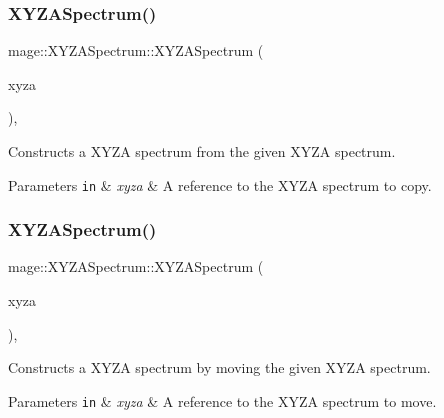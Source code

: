 \subsubsection{\texorpdfstring{X\+Y\+Z\+A\+Spectrum()}{XYZASpectrum()}\hspace{0.1cm}{\footnotesize\ttfamily [3/10]}}
{\footnotesize\ttfamily mage\+::\+X\+Y\+Z\+A\+Spectrum\+::\+X\+Y\+Z\+A\+Spectrum (\begin{DoxyParamCaption}\item[{const \hyperlink{structmage_1_1_x_y_z_a_spectrum}{X\+Y\+Z\+A\+Spectrum} \&}]{xyza }\end{DoxyParamCaption})\hspace{0.3cm}{\ttfamily [default]}, {\ttfamily [noexcept]}}

Constructs a X\+Y\+ZA spectrum from the given X\+Y\+ZA spectrum.


\begin{DoxyParams}[1]{Parameters}
\mbox{\tt in}  & {\em xyza} & A reference to the X\+Y\+ZA spectrum to copy. \\
\hline
\end{DoxyParams}
\hypertarget{structmage_1_1_x_y_z_a_spectrum_a08e4635f76feced3cabc8a8c7289f036}{}\label{structmage_1_1_x_y_z_a_spectrum_a08e4635f76feced3cabc8a8c7289f036} 
\subsubsection{\texorpdfstring{X\+Y\+Z\+A\+Spectrum()}{XYZASpectrum()}\hspace{0.1cm}{\footnotesize\ttfamily [4/10]}}
{\footnotesize\ttfamily mage\+::\+X\+Y\+Z\+A\+Spectrum\+::\+X\+Y\+Z\+A\+Spectrum (\begin{DoxyParamCaption}\item[{\hyperlink{structmage_1_1_x_y_z_a_spectrum}{X\+Y\+Z\+A\+Spectrum} \&\&}]{xyza }\end{DoxyParamCaption})\hspace{0.3cm}{\ttfamily [default]}, {\ttfamily [noexcept]}}

Constructs a X\+Y\+ZA spectrum by moving the given X\+Y\+ZA spectrum.


\begin{DoxyParams}[1]{Parameters}
\mbox{\tt in}  & {\em xyza} & A reference to the X\+Y\+ZA spectrum to move. \\
\hline
\end{DoxyParams}
\hypertarget{structmage_1_1_x_y_z_a_spectrum_a4c6548c1f2aa02a25e90d5331da75c63}{}\label{structmage_1_1_x_y_z_a_spectrum_a4c6548c1f2aa02a25e90d5331da75c63} 
